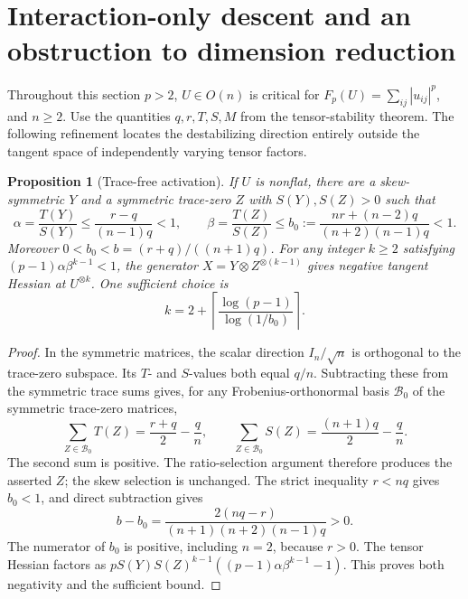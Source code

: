\documentclass[11pt]{article}
\newtheorem{proposition}[theorem]{Proposition}
\begin{document}
\section{Interaction-only descent and an obstruction to dimension reduction}
\label{sec:interaction-descent}

Throughout this section $p>2$, $U\in O(n)$ is critical for
$F_p(U)=\sum_{ij}|u_{ij}|^p$, and $n\ge2$. Use the quantities
$q,r,T,S,M$ from the tensor-stability theorem. The following refinement
locates the destabilizing direction entirely outside the tangent space
of independently varying tensor factors.

\begin{proposition}[Trace-free activation]
If $U$ is nonflat, there are a skew-symmetric $Y$ and a symmetric
trace-zero $Z$ with $S(Y),S(Z)>0$ such that
\[
 \alpha=\frac{T(Y)}{S(Y)}\le\frac{r-q}{(n-1)q}<1,
 \qquad
 \beta=\frac{T(Z)}{S(Z)}\le
 b_0:=\frac{nr+(n-2)q}{(n+2)(n-1)q}<1.
\]
Moreover $0<b_0<b=(r+q)/((n+1)q)$. For any integer $k\ge2$ satisfying
$(p-1)\alpha\beta^{k-1}<1$, the generator
$X=Y\otimes Z^{\otimes(k-1)}$ gives negative tangent Hessian at
$U^{\otimes k}$. One sufficient choice is
\[
 k=2+\left\lceil\frac{\log(p-1)}{\log(1/b_0)}\right\rceil.
\]
\end{proposition}
\begin{proof}
In the symmetric matrices, the scalar direction $I_n/\sqrt n$ is
orthogonal to the trace-zero subspace. Its $T$- and $S$-values both
equal $q/n$. Subtracting these from the symmetric trace sums gives,
for any Frobenius-orthonormal basis $\mathcal B_0$ of the symmetric
trace-zero matrices,
\[
 \sum_{Z\in\mathcal B_0}T(Z)=\frac{r+q}{2}-\frac qn,
 \qquad
 \sum_{Z\in\mathcal B_0}S(Z)=\frac{(n+1)q}{2}-\frac qn.
\]
The second sum is positive. The ratio-selection argument therefore
produces the asserted $Z$; the skew selection is unchanged.
The strict inequality $r<nq$ gives $b_0<1$, and direct subtraction gives
\[
 b-b_0=\frac{2(nq-r)}{(n+1)(n+2)(n-1)q}>0.
\]
The numerator of $b_0$ is positive, including $n=2$, because $r>0$.
The tensor Hessian factors as
$pS(Y)S(Z)^{k-1}((p-1)\alpha\beta^{k-1}-1)$.
This proves both negativity and the sufficient bound.
\end{proof}
\end{document}
